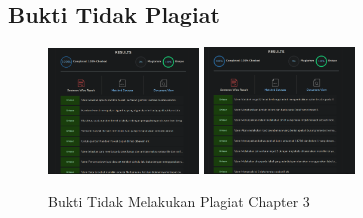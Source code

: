 \subsection{Bukti Tidak Plagiat}
\begin{figure}[H]
\centering
	\includegraphics[width=4cm]{figures/1174026/3/buktiplagiat/1.PNG}
	\includegraphics[width=4cm]{figures/1174026/3/buktiplagiat/2.PNG}
	\caption{Bukti Tidak Melakukan Plagiat Chapter 3}
\end{figure}

